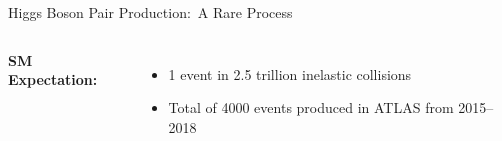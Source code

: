 \documentclass[11pt, xcolor={dvipsnames}, aspectratio=169, notes]{beamer}
\begin{document}
\begin{frame}{Higgs Boson Pair Production:\ A Rare Process}
\begin{columns}

    \textbf{SM Expectation:}
    \vspace{0.5em}
    \begin{itemize}
      \setlength{\itemsep}{1em}

    \item 1 \HH event in 2.5 trillion inelastic collisions

    \item Total of 4000 \HH events produced in ATLAS from 2015--2018


    \end{itemize}
  \end{columns}
\end{frame}

\end{document}
